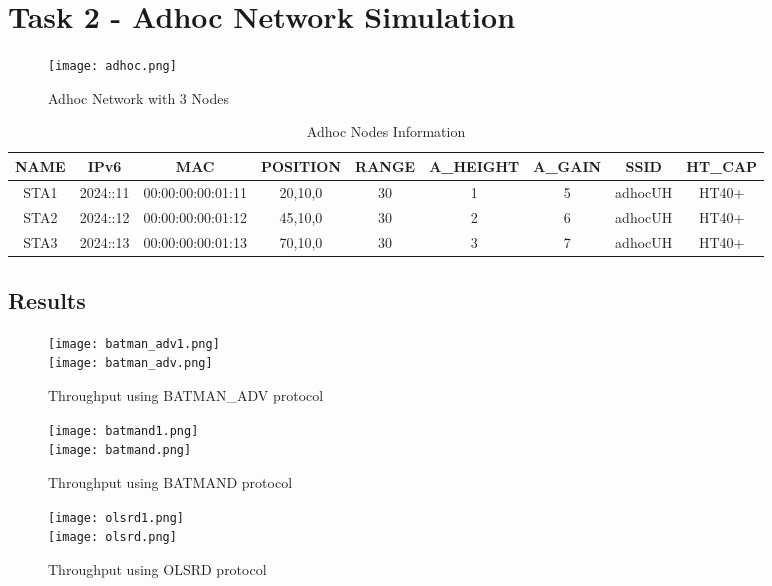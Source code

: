 \documentclass{article}
\begin{document}
\newpage
\section{Task 2 - Adhoc Network Simulation}
    	\begin{figure}[h]
        		\centering
        		\texttt{[image: adhoc.png]}
        		\caption{Adhoc Network with 3 Nodes}
        		\label{fig:t2-1}
    	\end{figure}
    	\begin{table}[h]
        		\begin{tabular}{|c|c|c|c|c|c|c|c|c|}
        			\hline
        			NAME & IPv6 & MAC & POSITION & RANGE & A\_HEIGHT & A\_GAIN & SSID & HT\_CAP\\
        			\hline
        			STA1 & 2024::11 & 00:00:00:00:01:11 & 20,10,0 & 30 & 1 & 5 & adhocUH & HT40+ \\
        			STA2 & 2024::12 & 00:00:00:00:01:12 & 45,10,0 & 30 & 2 & 6 & adhocUH & HT40+ \\
        			STA3 & 2024::13 & 00:00:00:00:01:13 & 70,10,0 & 30 & 3 & 7 & adhocUH & HT40+ \\
        			\hline
        		\end{tabular}
       	 	\caption{Adhoc Nodes Information}
        		\label{tab:3}
    	\end{table}
	
\newpage
\subsection{Results}
    	\begin{figure}[h]
        		\centering
        		\texttt{[image: batman\_adv1.png]} \\
        		\texttt{[image: batman\_adv.png]}
        		\caption{Throughput using BATMAN\_ADV protocol}
        		\label{fig:t2-2}
    	\end{figure}
   
\newpage
    	\begin{figure}[h]
        		\centering
        		\texttt{[image: batmand1.png]} \\
        		\texttt{[image: batmand.png]}
        		\caption{Throughput using BATMAND protocol}
        		\label{fig:t2-3}
    	\end{figure}
	
\newpage
    	\begin{figure}[h]
        		\centering
        		\texttt{[image: olsrd1.png]} \\
        		\texttt{[image: olsrd.png]}
        		\caption{Throughput using OLSRD protocol}
        		\label{fig:t2-4}
    	\end{figure}
	
\end{document}
